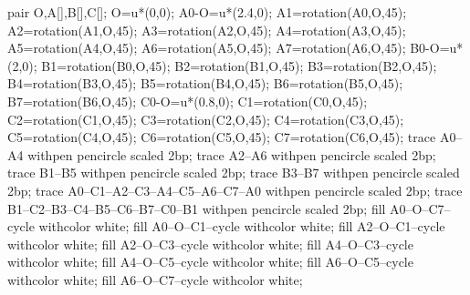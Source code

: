 \begin{activite}
\begin{changemargin}{-10mm}{-10mm}
\begin{center}
\begin{multicols}{2}
\begin{enumerate}
{{                    \begin{Geometrie}[CoinBG={(-3u,-3.5u)},CoinHD={(3u,3u)}]
                        pair O,A[],B[],C[];
                        O=u*(0,0);
                        A0-O=u*(2.4,0);
                        A1=rotation(A0,O,45);                        
                        A2=rotation(A1,O,45);
                        A3=rotation(A2,O,45);
                        A4=rotation(A3,O,45);
                        A5=rotation(A4,O,45);
                        A6=rotation(A5,O,45);
                        A7=rotation(A6,O,45);
                        B0-O=u*(2,0);
                        B1=rotation(B0,O,45);                        
                        B2=rotation(B1,O,45);
                        B3=rotation(B2,O,45);
                        B4=rotation(B3,O,45);
                        B5=rotation(B4,O,45);
                        B6=rotation(B5,O,45);
                        B7=rotation(B6,O,45);
                        C0-O=u*(0.8,0);
                        C1=rotation(C0,O,45);                        
                        C2=rotation(C1,O,45);
                        C3=rotation(C2,O,45);
                        C4=rotation(C3,O,45);
                        C5=rotation(C4,O,45);
                        C6=rotation(C5,O,45);
                        C7=rotation(C6,O,45);
                        trace A0--A4 withpen pencircle scaled 2bp;
                        trace A2--A6 withpen pencircle scaled 2bp;
                        trace B1--B5 withpen pencircle scaled 2bp;
                        trace B3--B7 withpen pencircle scaled 2bp;
                        trace A0--C1--A2--C3--A4--C5--A6--C7--A0 withpen pencircle scaled 2bp;
                        trace B1--C2--B3--C4--B5--C6--B7--C0--B1 withpen pencircle scaled 2bp;
                        fill A0--O--C7--cycle withcolor white;
                        fill A0--O--C1--cycle withcolor white;
                        fill A2--O--C1--cycle withcolor white;
                        fill A2--O--C3--cycle withcolor white;
                        fill A4--O--C3--cycle withcolor white;
                        fill A4--O--C5--cycle withcolor white;
                        fill A6--O--C5--cycle withcolor white;
                        fill A6--O--C7--cycle withcolor white;

\end{Geometrie}}}
\end{enumerate}
\end{multicols}
\end{center}
\end{changemargin}
\end{activite}
